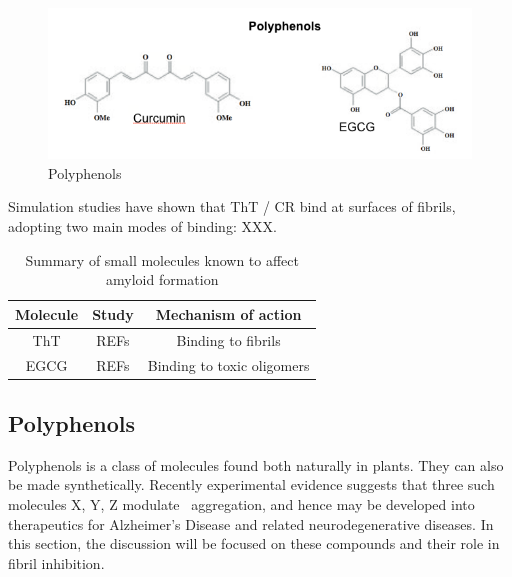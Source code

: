 
\begin{figure}
\centering
\includegraphics[width=6in]{figures/introduction/polyphenols.png}
\caption[Small molecule binders]{Polyphenols}
\label{fig:polyphenols}
\end{figure}

Simulation studies have shown that ThT / CR bind at surfaces of fibrils, adopting two main modes of binding: XXX.\cite{XXX I'm thinking of the Chun Wu study from 2007, were there more?}

\begin{table}%
  \begin{center}
  \vspace{10pt}
  \caption{Summary of small molecules known to affect amyloid formation}
  \label{tbl:inhibitors}
    \begin{tabular}{| c | c | c |}
      \hline
      Molecule & Study & Mechanism of action \\
      \hline
      ThT & REFs & Binding to fibrils \\
      EGCG & REFs & Binding to toxic oligomers \\
	  \hline
    \end{tabular}
  \end{center}
\end{table}

\subsection{Polyphenols}
Polyphenols is a class of molecules found both naturally in plants. They can also be made synthetically. Recently experimental evidence suggests that three such molecules X, Y, Z modulate \abeta\ aggregation, and hence may be developed into therapeutics for Alzheimer's Disease and related neurodegenerative diseases.  In this section, the discussion will be focused on these compounds and their role in fibril inhibition.

